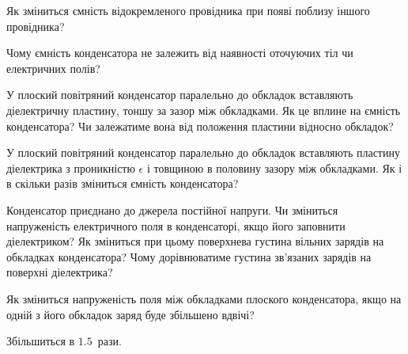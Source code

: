 \begin{problem}
    Як зміниться ємність відокремленого провідника при появі поблизу іншого провідника?
\end{problem}

\begin{problem}
    Чому ємність конденсатора не залежить від наявності оточуючих тіл чи електричних полів?
\end{problem}

\begin{problem}
    У плоский повітряний конденсатор паралельно до обкладок вставляють діелектричну пластину, тоншу за зазор між обкладками. Як це вплине на ємність конденсатора? Чи залежатиме вона від положення пластини відносно обкладок?
\end{problem}

\begin{problem}
    У плоский повітряний конденсатор паралельно до обкладок вставляють пластину діелектрика з проникністю $\epsilon$ і товщиною в половину зазору між обкладками. Як і в скільки разів зміниться ємність конденсатора?

\end{problem}

\begin{problem}%
Конденсатор приєднано до джерела постійної напруги. Чи зміниться напруженість електричного поля в конденсаторі, якщо його заповнити діелектриком? Як зміниться при цьому поверхнева густина вільних зарядів на обкладках конденсатора? Чому дорівнюватиме густина зв'язаних зарядів на поверхні діелектрика?
\end{problem}

\begin{problem}%
Як зміниться напруженість поля між обкладками плоского конденсатора, якщо на одній з його обкладок заряд буде збільшено вдвічі?
\begin{solution}
	Збільшиться в $1.5$~рази.
\end{solution}
\end{problem}


